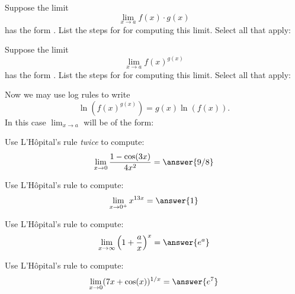 \documentclass{ximera}
\begin{document}
\begin{problem}
  Suppose the limit
  \[
  \lim_{x\to a} f(x) \cdot g(x)
  \]
  has the form \zeroTimesInfty.  List the steps for for computing this
  limit.  Select all that apply:
  \begin{selectAll}
  \end{selectAll}
\end{problem}


\begin{problem}
  Suppose the limit
  \[
  \lim_{x\to a} f(x)^{g(x)}
  \]
  has the form \oneToInfty.  List the steps for for computing this
  limit.  Select all that apply:
  \begin{selectAll}
  \end{selectAll}
  \begin{problem}
    Now we may use log rules to write
    \[
    \ln(f(x)^{g(x)}) = g(x)\ln(f(x)).
    \]
    In this case $\lim_{x\to a}$ will be of the form:
    \begin{multipleChoice}
      \choice{\numOverZero}
      \choice{\zeroOverZero}
      \choice[correct]{\zeroTimesInfty}
    \end{multipleChoice}
  \end{problem}
\end{problem}


\begin{problem}
  Use L'H\^opital's rule \textit{twice} to compute:
  \[
  \lim_{x\to 0} \frac{1-\cos(3x)}{4x^2} = \answer{9/8}
  \]
\end{problem}


\begin{problem}
  Use L'H\^opital's rule to compute:
  \[
  \lim_{x\to 0^+} x^{13x}= \answer{1}
  \]
\end{problem}


\begin{problem}
  Use L'H\^opital's rule to compute:
  \[
  \lim_{x\to \infty}\left(1+\frac{a}{x}\right)^x = \answer{e^a}
  \]
\end{problem}

\begin{problem}
  Use L'H\^opital's rule to compute:
  \[
  \lim_{x\to 0}(7x+\cos(x))^{1/x} = \answer{e^7}
  \]
\end{problem}
\end{document}
